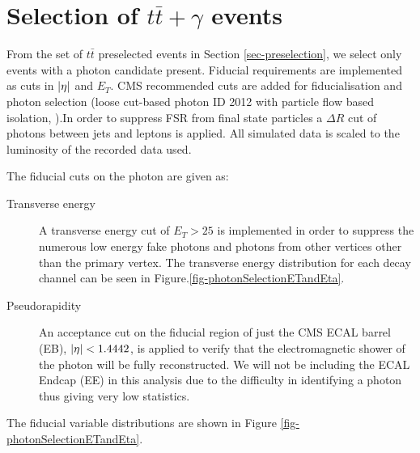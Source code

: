 
\section{Selection of $t\bar{t}+\gamma$ events} \label{sec-postselection}

From the set of $t\bar{t}$ preselected events in Section \ref{sec-preselection}, we select only events with a photon candidate present.  Fiducial requirements are implemented as cuts in $\lvert \eta \rvert$ and $E_T$. CMS recommended cuts are added for fiducialisation and photon selection (loose cut-based photon ID 2012 with particle flow based isolation, \cite{CutBasedIsolation2012}).In order to suppress FSR from final state particles a $\Delta R$ cut of photons between jets and leptons is applied. All simulated data is scaled to the luminosity of the recorded data used.  

The fiducial cuts on the photon are given as:

\begin{description}

\item[Transverse energy] A transverse energy cut of $E_T > 25$ is implemented in order to suppress the numerous low energy fake photons and photons from other vertices other than the primary
vertex. The transverse energy distribution for each decay channel can be seen in Figure.\ref{fig-photonSelectionETandEta}.

\item[Pseudorapidity] An acceptance cut on the fiducial region of just the CMS ECAL barrel (EB), $\lvert \eta \rvert < 1.4442$, is applied to verify that the electromagnetic shower of the photon will be fully reconstructed. We will not be including the ECAL Endcap (EE) in this analysis due to the difficulty in identifying a photon thus giving very low statistics.

\end{description}

The fiducial variable distributions are shown in Figure \ref{fig-photonSelectionETandEta}.


